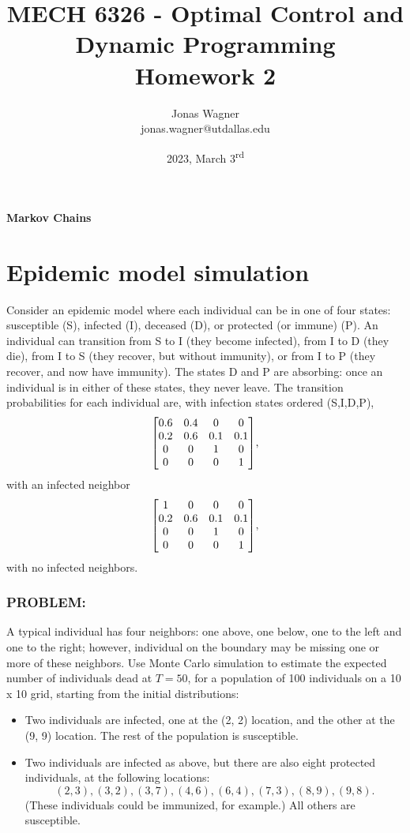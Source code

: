 \documentclass[]{article}
\title{
    MECH 6326 - Optimal Control and Dynamic Programming \\ 
    Homework 2
}
\author{Jonas Wagner\\ jonas.wagner@utdallas.edu}
\date{2023, March 3\textsuperscript{rd}}
\newcommand{\Problem}{\subsubsection*{\textbf{PROBLEM:}}}
\begin{document}
\maketitle

\tableofcontents

\newpage
\textbf{Markov Chains}
\section{Epidemic model simulation} 
Consider an epidemic model where each individual can be in one of four states: 
susceptible (S), infected (I), deceased (D), or protected (or immune) (P). 
An individual can transition from S to I (they become infected), from I to D (they die), from I to S (they recover, but without immunity), or from I to P (they recover, and now have immunity). 
The states D and P are absorbing: once an individual is in either of these states, they never leave. 
The transition probabilities for each individual are, with infection states ordered (S,I,D,P),
\[
    \mqty[
        0.6 & 0.4 & 0   & 0   \\
        0.2 & 0.6 & 0.1 & 0.1 \\
        0   & 0   & 1   & 0   \\
        0   & 0   & 0   & 1],
\] with an infected neighbor \[
    \mqty[
        1   & 0   & 0   & 0   \\
        0.2 & 0.6 & 0.1 & 0.1 \\
        0   & 0   & 1   & 0   \\
        0   & 0   & 0   & 1],
\] with no infected neighbors.

\Problem
A typical individual has four neighbors: one above, one below, one to the left and one to the right; however, individual on the boundary may be missing one or more of these neighbors.
Use Monte Carlo simulation to estimate the expected number of individuals dead at $T = 50$, for a population of 100 individuals on a 10 x 10 grid, starting from the initial distributions:
\begin{itemize}
    \item Two individuals are infected, one at the (2, 2) location, and the other at the (9, 9) location.
    The rest of the population is susceptible.
    \item Two individuals are infected as above, but there are also eight protected individuals, at the following locations:\[
        (2, 3), (3, 2), (3, 7), (4, 6), (6, 4), (7, 3), (8, 9), (9, 8).
    \]
    (These individuals could be immunized, for example.) 
    All others are susceptible.    
\end{itemize}
\end{document}
